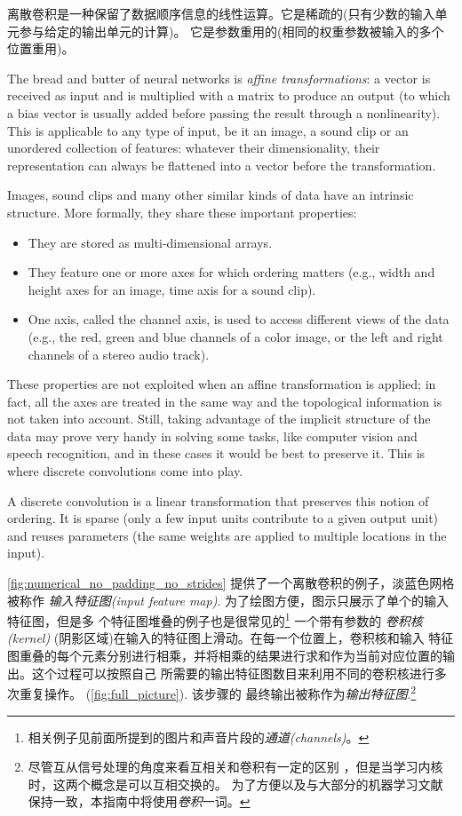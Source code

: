 \documentclass[notitlepage]{report}
\begin{document}
离散卷积是一种保留了数据顺序信息的线性运算。它是稀疏的(只有少数的输入单元参与给定的输出单元的计算)。
它是参数重用的(相同的权重参数被输入的多个位置重用)。



The bread and butter of neural networks is \emph{affine transformations}: a
vector is received as input and is multiplied with a matrix to produce an
output (to which a bias vector is usually added before passing the result
through a nonlinearity). This is applicable to any type of input, be it an
image, a sound clip or an unordered collection of features: whatever their
dimensionality, their representation can always be flattened into a vector
before the transformation.

Images, sound clips and many other similar kinds of data have an intrinsic
structure. More formally, they share these important properties:

\begin{itemize}
    \item They are stored as multi-dimensional arrays.
    \item They feature one or more axes for which ordering matters (e.g., width
        and height axes for an image, time axis for a sound clip).
    \item One axis, called the channel axis, is used to access different views
        of the data (e.g., the red, green and blue channels of a color image, or
        the left and right channels of a stereo audio track).
\end{itemize}

These properties are not exploited when an affine transformation is applied; in
fact, all the axes are treated in the same way and the topological information
is not taken into account. Still, taking advantage of the implicit structure of
the data may prove very handy in solving some tasks, like computer vision and
speech recognition, and in these cases it would be best to preserve it. This is
where discrete convolutions come into play.

A discrete convolution is a linear transformation that preserves this notion of
ordering. It is sparse (only a few input units contribute to a given output
unit) and reuses parameters (the same weights are applied to multiple locations
in the input).

\autoref{fig:numerical_no_padding_no_strides} 提供了一个离散卷积的例子，淡蓝色网格被称作
{\em 输入特征图(input feature map)}. 为了绘图方便，图示只展示了单个的输入特征图，但是多
个特征图堆叠的例子也是很常见的\footnote{%
    相关例子见前面所提到的图片和声音片段的{\em 通道(channels)\/}。}
一个带有参数的 {\em 卷积核(kernel)\/} (阴影区域)在输入的特征图上滑动。在每一个位置上，卷积核和输入
特征图重叠的每个元素分别进行相乘，并将相乘的结果进行求和作为当前对应位置的输出。这个过程可以按照自己
所需要的输出特征图数目来利用不同的卷积核进行多次重复操作。 (\autoref{fig:full_picture}). 该步骤的
最终输出被称作为{\em 输出特征图}.\footnote{%
    尽管互从信号处理的角度来看互相关和卷积有一定的区别  ，但是当学习内核时，这两个概念是可以互相交换的。
    为了方便以及与大部分的机器学习文献保持一致，本指南中将使用{\em 卷积\/}一词。
}
\end{document}
